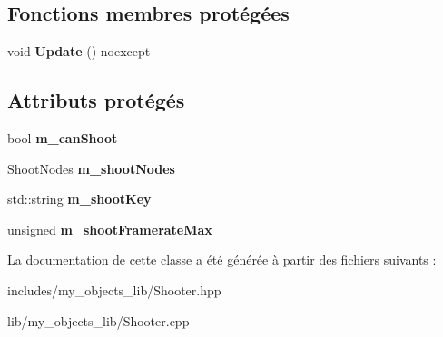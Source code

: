 \subsection*{Fonctions membres protégées}
\begin{DoxyCompactItemize}
\item 
\mbox{\label{classmy_1_1Shooter_a0e5a30cdfabf48052d2484c2e2ca6f6f}} 
void {\bfseries Update} () noexcept
\end{DoxyCompactItemize}
\subsection*{Attributs protégés}
\begin{DoxyCompactItemize}
\item 
\mbox{\label{classmy_1_1Shooter_a829743ae534a86061d3359aa4466109c}} 
bool {\bfseries m\+\_\+can\+Shoot}
\item 
\mbox{\label{classmy_1_1Shooter_a7f28784709dcee6b6379a96ed02af6cc}} 
Shoot\+Nodes {\bfseries m\+\_\+shoot\+Nodes}
\item 
\mbox{\label{classmy_1_1Shooter_a772980b6cb2304b5b7f58b538f97ff0b}} 
std\+::string {\bfseries m\+\_\+shoot\+Key}
\item 
\mbox{\label{classmy_1_1Shooter_abecd4ad91ecd7c2ae5a3f629078f4969}} 
unsigned {\bfseries m\+\_\+shoot\+Framerate\+Max}
\end{DoxyCompactItemize}


La documentation de cette classe a été générée à partir des fichiers suivants \+:\begin{DoxyCompactItemize}
\item 
includes/my\+\_\+objects\+\_\+lib/Shooter.\+hpp\item 
lib/my\+\_\+objects\+\_\+lib/Shooter.\+cpp\end{DoxyCompactItemize}
